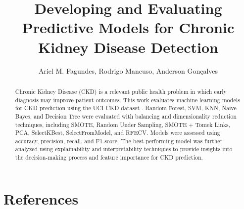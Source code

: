 \documentclass[12pt]{article}
\title{Developing and Evaluating Predictive Models for Chronic Kidney Disease Detection}
\author{Ariel M. Fagundes\inst{1}, Rodrigo Mancuso\inst{1}, Anderson Gonçalves\inst{1} }
\begin{document}
\maketitle

\begin{abstract}

Chronic Kidney Disease (CKD) is a relevant public health problem in which early diagnosis may
improve patient outcomes. This work evaluates machine learning models for CKD prediction using the
UCI CKD dataset \cite{risk_factor_prediction_of_chronic_kidney_disease_857}. Random Forest, SVM,
KNN, Naive Bayes, and Decision Tree were evaluated with balancing and dimensionality reduction
techniques, including SMOTE, Random Under Sampling, SMOTE + Tomek Links, PCA, SelectKBest,
SelectFromModel, and RFECV. Models were assessed using accuracy, precision, recall, and F1-score.
The best-performing model was further analyzed using explainability and interpretability techniques
to provide insights into the decision-making process and feature importance for CKD prediction.

\end{abstract}










\section{References}


\end{document}
